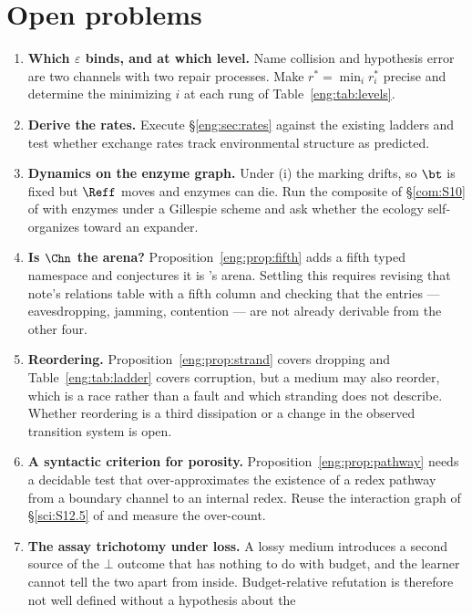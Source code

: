 \section{Open problems}\label{eng:S14}
\label{eng:sec:open}

\begin{enumerate}[itemsep=4pt]
\item \textbf{Which $\varepsilon$ binds, and at which level.} Name
collision and hypothesis error are two channels with two repair processes.
Make $r^\ast = \min_i r^\ast_i$ precise and determine the minimizing $i$ at
each rung of Table~\ref{eng:tab:levels}.
\item \textbf{Derive the rates.} Execute \S\ref{eng:sec:rates} against the
existing ladders and test whether exchange rates track environmental
structure as predicted.
\item \textbf{Dynamics on the enzyme graph.} Under (i) the marking drifts,
so $\bt$ is fixed but $\Reff$ moves and enzymes can die. Run the composite
of \S\ref{com:S10} of \chComp with enzymes under a Gillespie scheme and ask
whether the ecology self-organizes toward an expander.
\item \textbf{Is $\Chn$ the arena?} Proposition~\ref{eng:prop:fifth} adds a
fifth typed namespace and conjectures it is \chComp's arena.
Settling this requires revising that note's relations table with a fifth
column and checking that the entries --- eavesdropping, jamming,
contention --- are not already derivable from the other four.
\item \textbf{Reordering.} Proposition~\ref{eng:prop:strand} covers dropping
and Table~\ref{eng:tab:ladder} covers corruption, but a medium may also
reorder, which is a race rather than a fault and which stranding does not
describe. Whether reordering is a third dissipation or a change in the
observed transition system is open.
\item \textbf{A syntactic criterion for porosity.}
Proposition~\ref{eng:prop:pathway} needs a decidable test that
over-approximates the existence of a redex pathway from a boundary
channel to an internal redex. Reuse the interaction graph of
\S\ref{sci:S12.5} of \chSci and measure the over-count.
\item \textbf{The assay trichotomy under loss.} A lossy medium introduces
a second source of the $\bot$ outcome that has nothing to do with budget,
and the learner cannot tell the two apart from inside. Budget-relative
refutation is therefore not well defined without a hypothesis about the

\end{enumerate}
